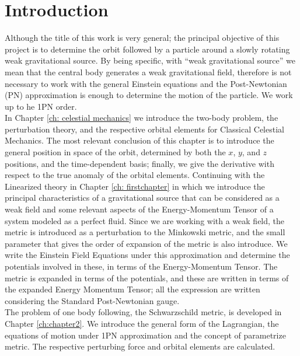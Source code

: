 \chapter*{Introduction}
Although the title of this work is very general; the principal objective of this project is to determine the orbit followed by a particle around a slowly rotating weak gravitational source. By being specific, with ``weak gravitational source'' we mean that the central body generates a weak gravitational field, therefore is not necessary to work with the general Einstein equations and the Post-Newtonian (PN) approximation is enough to determine the motion of the particle. We work up to he 1PN order. \cite{ GravityPoisson, Weinberg, Theoryandexperiments}\\

In Chapter \ref{ch: celestial mechanics} we introduce the two-body problem, the perturbation theory, and the respective orbital elements for Classical Celestial Mechanics. The most relevant conclusion of this chapter is to introduce the general position in space of the orbit, determined by both the $x$, $y$, and $z$ positions, and the time-dependent basis; finally, we give the derivative with respect to the true anomaly of the orbital elements. Continuing with the Linearized theory in Chapter \ref{ch: firstchapter} in which we introduce the principal characteristics of a gravitational source that can be considered as a weak field and some relevant aspects of the Energy-Momentum Tensor of a system modeled as a perfect fluid. Since we are working with a weak field, the metric is introduced as a perturbation to the Minkowski metric, and the small parameter that gives the order of expansion of the metric is also introduce. We write the Einstein Field Equations under this approximation and determine the potentials involved in these, in terms of the Energy-Momentum Tensor. The metric is expanded in terms of the potentials, and these are written in terms of the expanded Energy Momentum Tensor; all the expression are written considering the Standard Post-Newtonian gauge.\cite{GravityPoisson} \\

The problem of one body following, the Schwarzschild metric, is developed in Chapter \ref{ch:chapter2}. We introduce the general form of the Lagrangian, the equations of motion under 1PN approximation and the concept of parametrize metric. The respective perturbing force and orbital elements are calculated.\\


